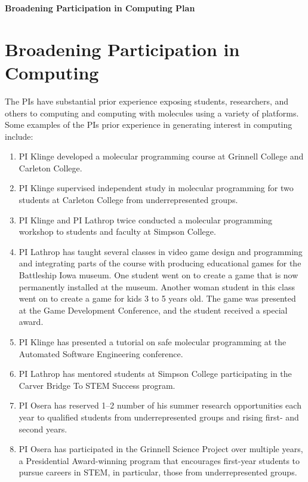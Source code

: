 \documentclass[11pt]{article}
\begin{document}
    \setcounter{page}{1}
    \begin{center}
        {\Large {\bf Broadening Participation in Computing Plan}}
    \end{center}

\section{Broadening Participation in Computing}

The PIs have substantial prior experience exposing students, researchers, and others to computing and computing with molecules using a variety of platforms.  Some examples of the PIs prior experience in generating interest in computing include:
\begin{enumerate}
	\item PI Klinge developed a molecular programming course at Grinnell College and Carleton College.
	\item PI Klinge supervised independent study in molecular programming for two students at Carleton College from underrepresented groups.
	\item PI Klinge and PI Lathrop twice conducted a molecular programming workshop to students and faculty at Simpson College.
	\item PI Lathrop has taught several classes in video game design and programming and integrating parts of the course with producing educational games for the Battleship Iowa museum. One student went on to create a game that is now permanently installed at the museum.  Another woman student in this class went on to create a game for kids 3 to 5 years old.  The game was presented at the Game Development Conference, and the student received a special award.
	\item PI Klinge has presented a tutorial on safe molecular programming at the Automated Software Engineering conference.
	\item PI Lathrop has mentored students at Simpson College participating in the Carver Bridge To STEM Success program.
	\item PI Osera has reserved 1--2 number of his summer research opportunities each year to qualified students from underrepresented groups and rising first- and second years.
	\item PI Osera has participated in the Grinnell Science Project over multiple years, a Presidential Award-winning program that encourages first-year students to pursue careers in STEM, in particular, those from underrepresented groups.
\end{enumerate}
\end{document}
